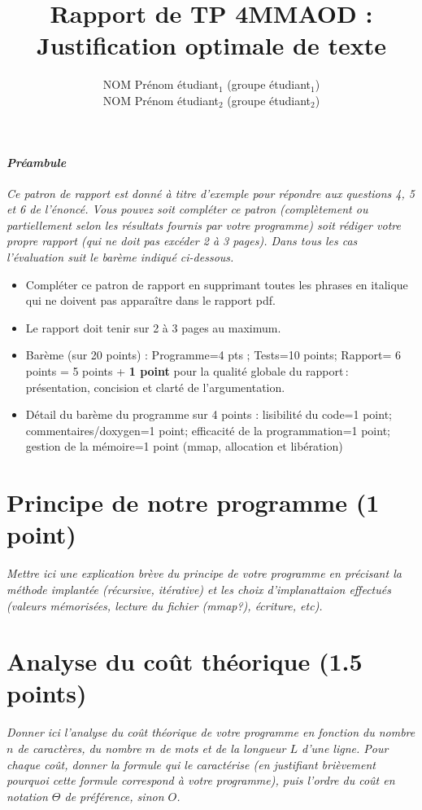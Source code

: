 \documentclass[a4paper,10pt,french]{article}
\title{Rapport de TP 4MMAOD : Justification optimale de texte}
\author{
NOM Prénom étudiant$_1$ (groupe étudiant$_1$) 
\\ NOM Prénom étudiant$_2$ (groupe étudiant$_2$) 
}
\newcounter{question}%
\begin{document}
\maketitle

\paragraph{\em Préambule}
{\em Ce patron de rapport est donné à titre d'exemple pour répondre aux questions 4, 5 et 6 de l'énoncé.
Vous pouvez soit compléter ce patron (complètement ou partiellement selon les résultats fournis par votre programme)
soit rédiger votre propre rapport (qui ne doit pas excéder 2 à 3 pages). Dans tous les cas l'évaluation suit
le barème indiqué ci-dessous.
\begin{itemize} 
   \item Compléter ce patron de rapport en supprimant toutes les phrases en italique qui ne doivent pas apparaître dans le rapport pdf.
   \item Le rapport doit tenir sur 2 à 3 pages au maximum.
   \item Barème (sur 20 points) : Programme=4 pts ; Tests=10 points; Rapport= 6 points = 5 points + {\bf 1 point} pour la qualité globale du rapport\,: présentation, concision et clarté de l'argumentation.
   \item Détail du barème du programme sur 4 points :  lisibilité du code=1 point; commentaires/doxygen=1 point; 
      efficacité de la programmation=1 point; gestion de la mémoire=1 point (mmap, allocation et libération)
\end{itemize}
}

\section{Principe de notre  programme (1 point)}
{\em Mettre ici une explication brève du principe de votre programme en  précisant la méthode implantée (récursive, itérative) et les
choix d'implanattaion effectués (valeurs mémorisées, lecture du fichier (mmap?), écriture, etc).
\\
} 

\section{Analyse du coût théorique (1.5 points)}
{\em Donner ici l'analyse du coût théorique de votre programme en fonction du nombre $n$ de caractères, du nombre $m$ de mots et de
la longueur $L$ d'une ligne.
 Pour chaque coût, donner la formule qui le caractérise (en justifiant brièvement pourquoi cette formule correspond à votre programme), 
 puis l'ordre du coût en notation $\Theta$ de préférence, sinon $O$.}
\end{document}
